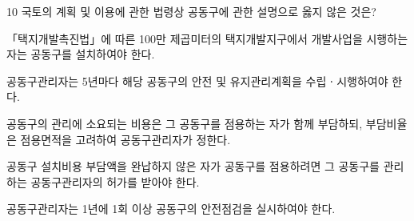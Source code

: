 \begin{question}{10}
국토의 계획 및 이용에 관한 법령상 공동구에 관한 설명으로 옳지 않은 것은?
\begin{choices}
  \item 「택지개발촉진법」에 따른 100만 제곱미터의 택지개발지구에서 개발사업을 시행하는 자는 공동구를 설치하여야 한다.
  \item 공동구관리자는 5년마다 해당 공동구의 안전 및 유지관리계획을 수립ㆍ시행하여야 한다.
  \item 공동구의 관리에 소요되는 비용은 그 공동구를 점용하는 자가 함께 부담하되, 부담비율은 점용면적을 고려하여 공동구관리자가 정한다.
  \item 공동구 설치비용 부담액을 완납하지 않은 자가 공동구를 점용하려면 그 공동구를 관리하는 공동구관리자의 허가를 받아야 한다.
  \item 공동구관리자는 1년에 1회 이상 공동구의 안전점검을 실시하여야 한다.
\end{choices}
\end{question}
